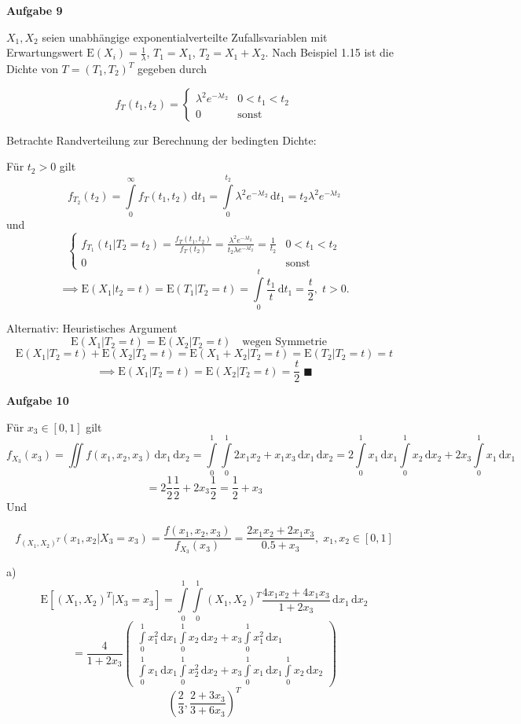 \documentclass[12pt, a4paper]{article}
\newcommand{\E}{\mbox{I\negthinspace E}}
\theoremstyle{plain}
\theoremstyle{definition}
\newcommand{\1}{\mathds{1}}
\renewcommand{\E}{\mathrm{E}}
\renewcommand{\d}{\,\mathrm{d}}
\providecommand{\mtext}[1]{\quad \text{#1} \quad}
\begin{document}
\textbf{Aufgabe 9}

$X_1, X_2$ seien unabhängige exponentialverteilte Zufallsvariablen mit Erwartungswert $\E(X_i) = \frac{1}{\lambda}$, $T_1 = X_1$, $T_2 = X_1 + X_2$.
Nach Beispiel 1.15 ist die Dichte von $T = (T_1, T_2)^T$ gegeben durch

\[  f_T(t_1, t_2) = \begin{cases} \lambda^2 e^{-\lambda t_2} & 0 < t_1 < t_2 \\ 0 & \text{sonst} \end{cases}  \]

Betrachte Randverteilung zur Berechnung der bedingten Dichte:

Für $t_2 > 0$ gilt \[f_{T_2}(t_2) = \int\limits_0^\infty f_T (t_1, t_2) \d t_1 = \int\limits_0^{t_2} \lambda^2 e^{-\lambda t_2} \d t_1 = t_2 \lambda^2 e^{-\lambda t_2}    \] und 
\[ \begin{cases} f_{T_1} (t_1 | T_2 = t_2) = \frac{f_T (t_1, t_2)}{f_T (t_2)} = \frac{\lambda^2 e^{-\lambda t_2}}{t_2 \lambda e^{-\lambda t_2}} = \frac{1}{t_2} & 0<t_1 < t_2  \\ 0 & \text{sonst} \end{cases}  \]
\[  \implies \E(X_1 | t_2 = t) = \E(T_1 | T_2 = t) = \int\limits_0^t  \frac{t_1}{t} \d t_1 = \frac{t}{2}, \; t>0.   \]


Alternativ: Heuristisches Argument
\[ \E(X_1 | T_2 = t) = \E(X_2 | T_2 = t) \mtext{wegen Symmetrie}     \]
\[ \E(X_1 | T_2 = t) + \E(X_2 | T_2 = t) = \E(X_1 + X_2 | T_2 = t) = \E(T_2 | T_2 = t) = t    \]
\[ \implies \E(X_1 | T_2 = t) = \E(X_2 | T_2 = t) = \frac{t}{2} \; \blacksquare  \]


\textbf{Aufgabe 10}

Für $x_3 \in [0,1]$ gilt
\[ f_{X_3} (x_3) = \iint f(x_1, x_2, x_3) \d x_1 \d x_2 = \int\limits_0^1 \int\limits_0^1 2 x_1 x_2 + x_1 x_3 \d x_1 \d x_2 = 2 \int\limits_0^1 x_1 \d x_1 \int\limits_0^1 x_2 \d x_2 + 2 x_3 \int\limits_0^1 x_1 \d x_1  \]
\[ = 2 \frac{1}{2} \frac{1}{2} + 2 x_3 \frac{1}{2} = \frac{1}{2} + x_3     \]
Und

\[  f_{(X_1, X_2)^T} (x_1, x_2 | X_3 = x_3) = \frac{f(x_1, x_2, x_3)}{f_{X_3}(x_3)} = \frac{2 x_1 x_2 + 2 x_1 x_3}{0.5 + x_3}, \; x_1 , x_2 \in [0,1]    \]

a) \[  \E[(X_1, X_2)^T | X_3 = x_3] =  \int\limits_0^1 \int\limits_0^1 (X_1, X_2)^T \frac{4x_1 x_2 + 4 x_1 x_3}{1 + 2 x_3} \d x_1 \d x_2  \]
\[  = \frac{4}{1 + 2x_3}  \begin{pmatrix}   \int\limits_0^1 x_1^2 \d x_1 \int\limits_0^1 x_2 \d x_2 + x_3 \int\limits_0^1 x_1^2 \d x_1    \\
\int\limits_0^1 x_1 \d x_1 \int\limits_0^1 x_2^2 \d x_2 + x_3 \int\limits_0^1 x_1 \d x_1 \int\limits_0^1 x_2 \d x_2 \end{pmatrix} \]
\[ \left( \frac{2}{3}, \frac{2 + 3x_3}{3 + 6 x_3}  \right)^T  \]
\end{document}
